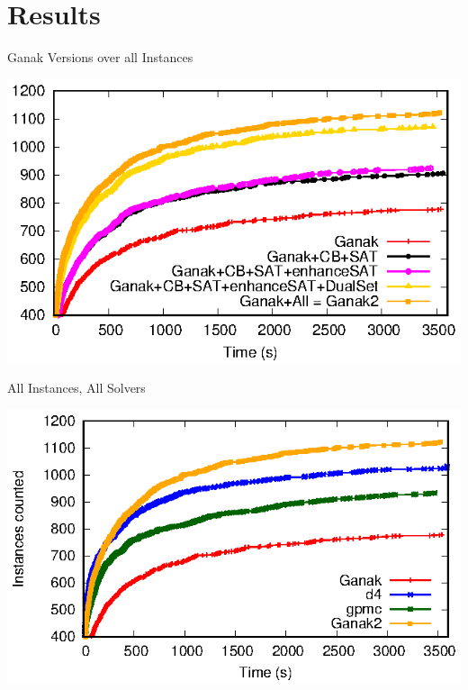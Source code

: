 \documentclass[aspectratio=169]{beamer}
\begin{document}
\section{Results}
\begin{frame}{Ganak Versions over all Instances}
  \begin{center}
    \includegraphics[scale=1.40]{figs/ganak-versions/run}
\end{center}
\end{frame}

\begin{frame}{All Instances, All Solvers}
  \begin{center}
  \includegraphics[scale=1.40]{figs/proj-and-unproj/run}
\end{center}
\end{frame}
\end{document}
